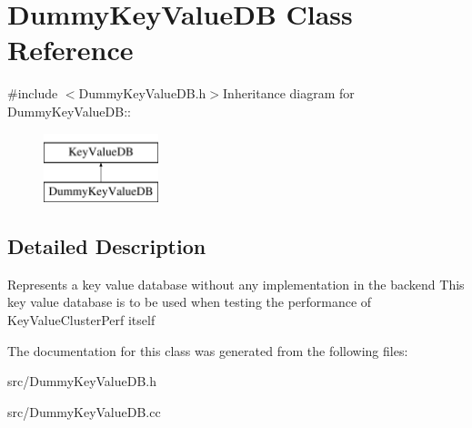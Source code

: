 \hypertarget{classDummyKeyValueDB}{
\section{DummyKeyValueDB Class Reference}
\label{classDummyKeyValueDB}
}


{\ttfamily \#include $<$DummyKeyValueDB.h$>$}Inheritance diagram for DummyKeyValueDB::\begin{figure}[H]
\begin{center}
\leavevmode
\includegraphics[height=2cm]{classDummyKeyValueDB}
\end{center}
\end{figure}


\subsection{Detailed Description}
Represents a key value database without any implementation in the backend This key value database is to be used when testing the performance of KeyValueClusterPerf itself 

The documentation for this class was generated from the following files:\begin{DoxyCompactItemize}
\item 
src/DummyKeyValueDB.h\item 
src/DummyKeyValueDB.cc\end{DoxyCompactItemize}
